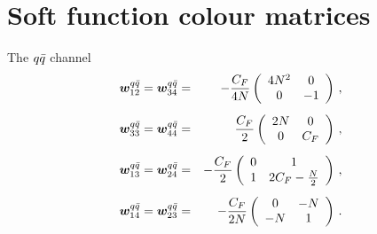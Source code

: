 \documentclass[a4paper,11pt]{report}
\numberwithin{equation}{section}
\newcommand{\bfw}{\bm{w}}
\begin{document}
\newpage

\appendix

\chapter{Soft function colour matrices}
\label{app:wmatrices}

The $q{\bar q}$ channel
%
\begin{eqnarray}
 \bfw_{12}^{q\qbar} = \bfw_{34}^{q\qbar} & = &
 - \frac{C_F}{4N}
 \left( \begin{array}{cc}
   4N^2 & 0 \\
   0 & -1 
 \end{array} \right)\,,
 \\[0.5em]
 \bfw_{33}^{q\qbar} = \bfw_{44}^{q\qbar} & = &
 \frac{C_F}{2}
 \left( \begin{array}{cc}
   2N & 0 \\
   0 & C_F
 \end{array} \right)\,,
 \\[0.5em]
 \bfw_{13}^{q\qbar} = \bfw_{24}^{q\qbar} & = &
 - \frac{C_F}{2}
 \left( \begin{array}{cc}
   0 & 1 \\
   1 & 2 C_F -\frac{N}{2}
 \end{array} \right)\,,
 \\[0.5em]
 \bfw_{14}^{q\qbar} = \bfw_{23}^{q\qbar} & = &
 - \frac{C_F}{2N}
 \left( \begin{array}{cc}
   0 & -N \\
   -N & 1 
 \end{array} \right)\,.
\end{eqnarray}
\end{document}
